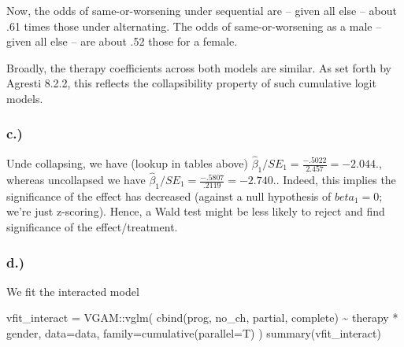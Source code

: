 \documentclass[
]{article}
\newenvironment{Shaded}{\begin{snugshade}}{\end{snugshade}}
\newcommand{\AttributeTok}[1]{\textcolor[rgb]{0.77,0.63,0.00}{#1}}
\newcommand{\FunctionTok}[1]{\textcolor[rgb]{0.00,0.00,0.00}{#1}}
\newcommand{\NormalTok}[1]{#1}
\newcommand{\OtherTok}[1]{\textcolor[rgb]{0.56,0.35,0.01}{#1}}
\newcommand{\SpecialCharTok}[1]{\textcolor[rgb]{0.00,0.00,0.00}{#1}}
\begin{document}
Now, the odds of same-or-worsening under sequential are -- given all
else -- about .61 times those under alternating. The odds of
same-or-worsening as a male -- given all else -- are about .52 those for
a female.

Broadly, the therapy coefficients across both models are similar. As set
forth by Agresti 8.2.2, this reflects the collapsibility property of
such cumulative logit models.

\hypertarget{c.-1}{%
\subsubsection{c.)}\label{c.-1}}

Unde collapsing, we have (lookup in tables above)
\(\hat\beta_1 / SE_{1} = \frac{-.5022}{2.457} = -2.044.\), whereas
uncollapsed we have
\(\hat\beta_1 / SE_{1} = \frac{-.5807}{.2119} = -2.740.\). Indeed, this
implies the significance of the effect has decreased (against a null
hypothesis of \(beta_1 = 0\); we're just z-scoring). Hence, a Wald test
might be less likely to reject and find significance of the
effect/treatment.

\hypertarget{d.}{%
\subsubsection{d.)}\label{d.}}

We fit the interacted model

\begin{Shaded}
\begin{Highlighting}[]
\NormalTok{vfit\_interact }\OtherTok{=}\NormalTok{ VGAM}\SpecialCharTok{::}\FunctionTok{vglm}\NormalTok{(}
  \FunctionTok{cbind}\NormalTok{(prog, no\_ch, partial, complete) }\SpecialCharTok{\textasciitilde{}}\NormalTok{ therapy }\SpecialCharTok{*}\NormalTok{ gender,}
  \AttributeTok{data=}\NormalTok{data,}
  \AttributeTok{family=}\FunctionTok{cumulative}\NormalTok{(}\AttributeTok{parallel=}\NormalTok{T)}
\NormalTok{)}
\FunctionTok{summary}\NormalTok{(vfit\_interact)}
\end{Highlighting}
\end{Shaded}
\end{document}
